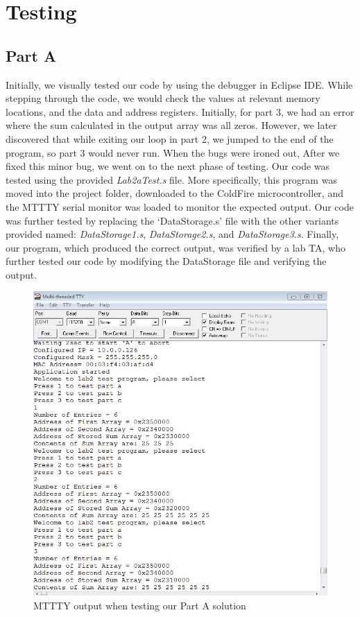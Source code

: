 \documentclass[letterpaper]{article}
\begin{document}
\section{Testing}
  \subsection{Part A}
    Initially, we visually tested our code by using the debugger in Eclipse IDE.
    While stepping through the code, we would check the values at relevant
    memory locations, and the data and address registers. Initially, for part 3,
    we had an error where the sum calculated in the output array was all zeros.
    However, we later discovered that while exiting our loop in part 2, we
    jumped to the end of the program, so part 3 would never run. When the bugs
    were ironed out, After we fixed this minor bug, we went on to the next phase
    of testing. Our code was tested using the provided \textit{Lab2aTest.s}
    file. More specifically, this program was moved into the project folder,
    downloaded to the ColdFire microcontroller, and the MTTTY serial monitor was
    loaded to monitor the expected output. Our code was further tested by
    replacing the `DataStorage.s' file with the other variants provided named:
    \textit{DataStorage1.s}, \textit{DataStorage2.s}, and
    \textit{DataStorage3.s}. Finally, our program, which produced the correct
    output, was verified by a lab TA, who further tested our code by modifying
    the DataStorage file and verifying the output.
    \begin{figure}[H]
      \centering
      \includegraphics[width=.65\textwidth]{part1.jpg}
      \caption{MTTTY output when testing our Part A solution}
    \end{figure}
\end{document}
